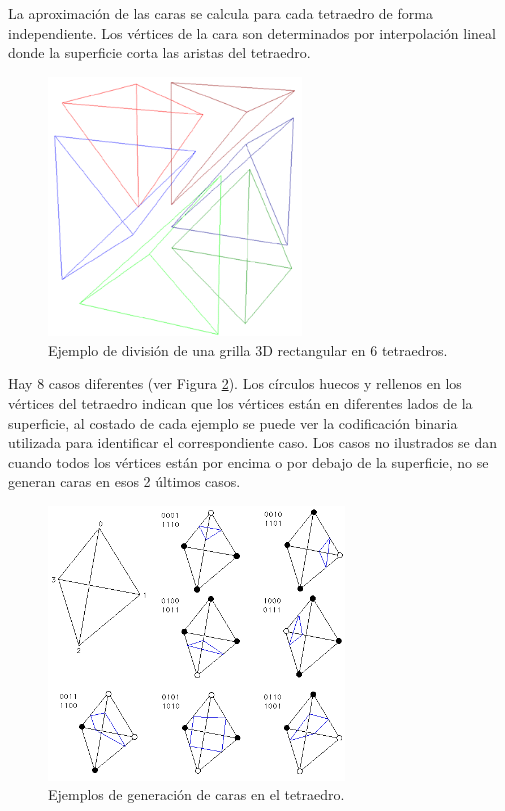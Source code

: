 \documentclass[12pt]{article}
\begin{document}
La aproximación de las caras se calcula para cada tetraedro de forma independiente. Los vértices de la cara son determinados por interpolación lineal donde la superficie corta las aristas del tetraedro.
\begin{figure}[h!]
\includegraphics[width=0.6\textwidth,center]{mt1.png}
\caption{Ejemplo de división de una grilla 3D rectangular en 6 tetraedros.}
\label{6tet}
\end{figure}
\clearpage
Hay 8 casos diferentes (ver Figura \ref{tet}). Los círculos huecos y rellenos en los vértices del tetraedro indican que los vértices están en diferentes lados de la superficie, al costado de cada ejemplo se puede ver la codificación binaria utilizada para identificar el correspondiente caso. Los casos no ilustrados se dan cuando todos los vértices están por encima o por debajo de la superficie, no se generan caras en esos 2 últimos casos.
\begin{figure}[h!]
\includegraphics[width=0.7\textwidth,center]{mt2.png}
\caption{Ejemplos de generación de caras en el tetraedro.}
\label{tet}
\end{figure}\\
\end{document}
